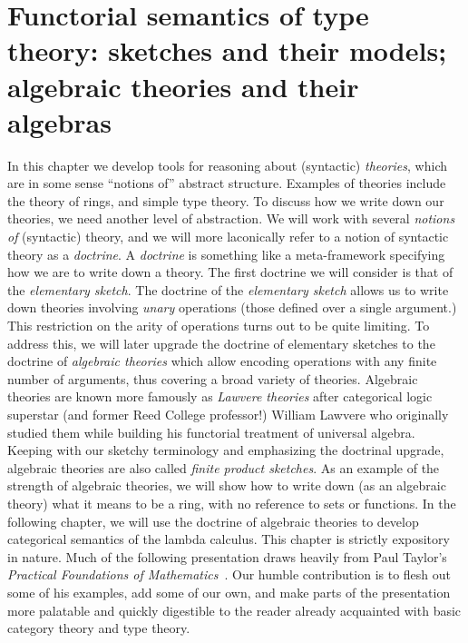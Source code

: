 \documentclass[12pt,twoside]{reedthesis}
\theoremstyle{definition}
\theoremstyle{remark}
\theoremstyle{plain}
\begin{document}
\chapter{Functorial semantics of type theory: sketches and their models; algebraic theories and their algebras}

In this chapter we develop tools for reasoning about (syntactic)
\emph{theories}, which are in some sense ``notions of'' abstract structure.
Examples of theories include the theory of rings, and simple type theory. To
discuss how we write down our theories, we need another level of abstraction. We
will work with several \emph{notions of} (syntactic) theory, and we will more
laconically refer to a notion of syntactic theory as a \emph{doctrine}. A
\emph{doctrine} is something like a meta-framework specifying how we are to
write down a theory. The first doctrine we will consider is that of the
\emph{elementary sketch}. %
The doctrine of the \emph{elementary sketch} allows us to write down theories
involving \emph{unary} operations (those defined over a single argument.) This
restriction on the arity of operations turns out to be quite limiting. To
address this, we will later upgrade the doctrine of elementary sketches to the
doctrine of \emph{algebraic theories} which allow encoding operations with any
finite number of arguments, thus covering a broad variety of theories. Algebraic
theories are known more famously as \emph{Lawvere theories} after categorical
logic superstar (and former Reed College professor!) William Lawvere who
originally studied them while building his functorial treatment of universal
algebra. Keeping with our sketchy terminology and emphasizing the doctrinal
upgrade, algebraic theories are also called \emph{finite product sketches}. As
an example of the strength of algebraic theories, we will show how to write down
(as an algebraic theory) what it means to be a ring, with no reference to sets
or functions. In the following chapter, we will use the doctrine of algebraic
theories to develop categorical semantics of the lambda calculus. This chapter
is strictly expository in nature. Much of the following presentation draws
heavily from Paul Taylor's \emph{Practical Foundations of Mathematics}~\cite{taylor_practical_1999}. Our humble contribution is to flesh out some of
his examples, add some of our own, and make parts of the presentation more
palatable and quickly digestible to the reader already acquainted with basic
category theory and type theory.
\end{document}
